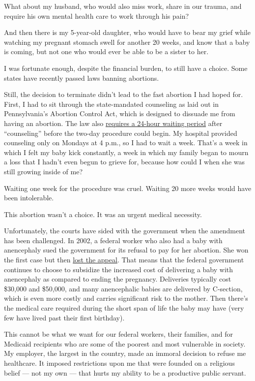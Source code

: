 What about my husband, who would also miss work, share in our trauma,
and require his own mental health care to work through his pain?

And then there is my 5-year-old daughter, who would have to bear my
grief while watching my pregnant stomach swell for another 20 weeks, and
know that a baby is coming, but not one who would ever be able to be a
sister to her.

I was fortunate enough, despite the financial burden, to still have a
choice. Some states have recently passed laws banning abortions.

Still, the decision to terminate didn't lead to the fast abortion I had
hoped for. First, I had to sit through the state-mandated counseling as
laid out in Pennsylvania's Abortion Control Act, which is designed to
dissuade me from having an abortion. The law also
\href{https://www.plannedparenthood.org/planned-parenthood-southeastern-pennsylvania/patients/pa-abortion-control-act}{requires
a 24-hour waiting period} after ``counseling'' before the two-day
procedure could begin. My hospital provided counseling only on Mondays
at 4 p.m., so I had to wait a week. That's a week in which I felt my
baby kick constantly, a week in which my family began to mourn a loss
that I hadn't even begun to grieve for, because how could I when she was
still growing inside of me?

Waiting one week for the procedure was cruel. Waiting 20 more weeks
would have been intolerable.

This abortion wasn't a choice. It was an urgent medical necessity.

Unfortunately, the courts have sided with the government when the
amendment has been challenged. In 2002, a federal worker who also had a
baby with anencephaly sued the government for its refusal to pay for her
abortion. She won the first case but then
\href{https://www.latimes.com/archives/la-xpm-2005-aug-19-na-milhealth19-story.html}{lost
the appeal}. That means that the federal government continues to choose
to subsidize the increased cost of delivering a baby with anencephaly as
compared to ending the pregnancy. Deliveries typically cost \$30,000 and
\$50,000, and many anencephalic babies are delivered by C-section, which
is even more costly and carries significant risk to the mother. Then
there's the medical care required during the short span of life the baby
may have (very few have lived past their first birthday).

This cannot be what we want for our federal workers, their families, and
for Medicaid recipients who are some of the poorest and most vulnerable
in society. My employer, the largest in the country, made an immoral
decision to refuse me healthcare. It imposed restrictions upon me that
were founded on a religious belief --- not my own --- that hurts my
ability to be a productive public servant.

